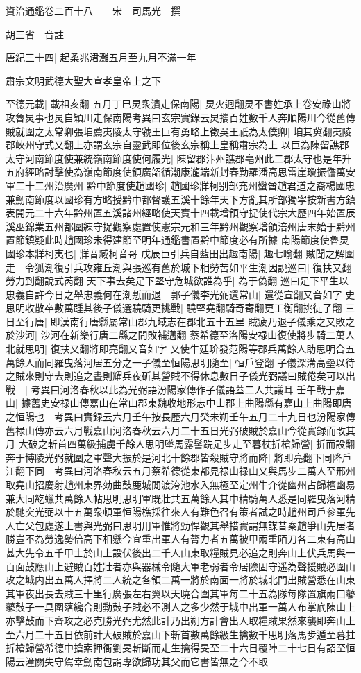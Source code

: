 資治通鑑卷二百十八　　宋　司馬光　撰

胡三省　音註

唐紀三十四|{
	起柔兆涒灘五月至九月不滿一年}


肅宗文明武德大聖大宣孝皇帝上之下

至德元載|{
	載祖亥翻}
五月丁巳炅衆潰走保南陽|{
	炅火迥翻炅不書姓承上卷安祿山將攻魯炅事也炅自穎川走保南陽考異曰玄宗實錄云炅攜百姓數千人奔順陽川今從舊傳}
賊就圍之太常卿張垍薦夷陵太守虢王巨有勇略上徵吳王祇為太僕卿|{
	垍其冀翻夷陵郡峽州守式又翻上亦謂玄宗自靈武即位後玄宗稱上皇稱肅宗為上}
以巨為陳留譙郡太守河南節度使兼統嶺南節度使何履光|{
	陳留郡汴州譙郡亳州此二郡太守也是年升五府經略討擊使為嶺南節度使領廣韶循潮康瀧端新封春勤羅潘高思雷崖瓊振儋萬安軍二十二州治廣州}
黔中節度使趙國珍|{
	趙國珍牂柯别部充州蠻酋趙君道之裔楊國忠兼劒南節度以國珍有方略授黔中都督護五溪十餘年天下方亂其所部獨寜按新書方鎮表開元二十六年黔州置五溪諸州經略使天寶十四載增領守捉使代宗大歷四年始置辰溪巫錦業五州都圍練守捉觀察處置使憲宗元和三年黔州觀察增領涪州唐末始于黔州置節鎮疑此時趙國珍未得建節至明年通鑑書置黔中節度必有所據}
南陽節度使魯炅國珍本牂柯夷也|{
	牂音臧柯音哥}
戊辰巨引兵自藍田出趣南陽|{
	趣七喻翻}
賊聞之解圍走　令狐潮復引兵攻雍丘潮與張巡有舊於城下相勞苦如平生潮因說巡曰|{
	復扶又翻勞力到翻說式芮翻}
天下事去矣足下堅守危城欲誰為乎|{
	為于偽翻}
巡曰足下平生以忠義自許今日之舉忠義何在潮慙而退　郭子儀李光弼還常山|{
	還從宣翻又音如字}
史思明收散卒數萬踵其後子儀選驍騎更挑戰|{
	驍堅堯翻騎奇寄翻更工衡翻挑徒了翻}
三日至行唐|{
	即漢南行唐縣屬常山郡九域志在郡北五十五里}
賊疲乃退子儀乘之又敗之於沙河|{
	沙河在新樂行唐二縣之間敗補邁翻}
蔡希德至洛陽安禄山復使將步騎二萬人北就思明|{
	復扶又翻將即亮翻又音如字}
又使牛廷玠發范陽等郡兵萬餘人助思明合五萬餘人而同羅曳落河居五分之一子儀至恒陽思明隨至|{
	恒戶登翻}
子儀深溝高壘以待之賊來則守去則追之晝則耀兵夜斫其營賊不得休息數日子儀光弼議曰賊倦矣可以出戰　|{
	考異曰河洛春秋以此為光弼語汾陽家傳作子儀語蓋二人共議耳}
壬午戰于嘉山|{
	據舊史安禄山傳嘉山在常山郡東魏收地形志中山郡上曲陽縣有嘉山上曲陽即唐之恒陽也　考異曰實録云六月壬午按長歷六月癸未朔壬午五月二十九日也汾陽家傳舊禄山傳亦云六月戰嘉山河洛春秋云六月二十五日光弼破賊於嘉山今從實録而改其月}
大破之斬首四萬級捕虜千餘人思明墜馬露髻跣足步走至暮杖折槍歸營|{
	折而設翻}
奔于博陵光弼就圍之軍聲大振於是河北十餘郡皆殺賊守將而降|{
	將即亮翻下同降戶江翻下同　考異曰河洛春秋云五月蔡希德從東都見禄山禄山又與馬步二萬人至邢州取堯山招慶射趙州東界効曲鼔鹿城閒渡洿池水入無極至定州牛介從幽州占歸檀幽易兼大同紇蠟共萬餘人帖思明思明軍既壯共五萬餘人其中精騎萬人悉是同羅曳落河精於馳突光弼以十五萬衆頓軍恒陽樵採往來人有難色召有策者試之時趙州司戶參軍先人亡父包處遂上書與光弼曰思明用軍惟將勁悍觀其舉措實謂無謀昔秦趙爭山先居者勝豈不為勞逸勢倍高下相懸今宜重出軍人有膂力者五萬被甲兩重陌刀各二東有高山甚大先令五千甲士於山上設伏後出二千人山東取糧賊見必追之則奔山上伏兵馬與一百面鼔應山上避賊百姓壯者亦與器械令隨大軍老弱者令居險固守遥為聲援賊必圍山攻之城内出五萬人擇將二人統之各領二萬一將於南面一將於城北門出賊營悉在山東其軍夜出長去賊三十里行廣張左右翼以天曉合圍其軍每二十五為隊每隊置旗兩口鼕鼕鼓子一具圍落纔合則動鼔子賊必不測人之多少然于城中出軍一萬人布掌㡳陳山上亦擊鼔而下齊攻之必克勝光弼尤然此計乃出朔方計會出人取糧賊果然來襲即奔山上至六月二十五日依前計大破賊於嘉山下斬首數萬餘級生擒數千思明落馬步遁至暮拄折槍歸營希德中搶索押衙劉旻斬斷而走生擒得旻至二十六日覆陣二十七日有詔至恒陽云潼關失守駕幸劒南包諝專欲歸功其父而它書皆無之今不取}
